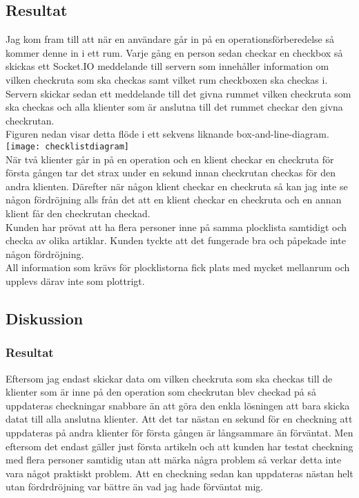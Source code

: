 \subsection{Resultat}
Jag kom fram till att när en användare går in på en operationsförberedelse så kommer denne in i ett rum. Varje gång en person sedan checkar en checkbox så skickas ett Socket.IO meddelande till servern som innehåller information om vilken checkruta som ska checkas samt vilket rum checkboxen ska checkas i. Servern skickar sedan ett meddelande till det givna rummet vilken checkruta som ska checkas och alla klienter som är anslutna till det rummet checkar den givna checkrutan. \\

Figuren nedan visar detta flöde i ett sekvens liknande box-and-line-diagram.
\texttt{[image: checklistdiagram]}\\

När två klienter går in på en operation och en klient checkar en checkruta för första gången tar det strax under en sekund innan checkrutan checkas för den andra klienten. Därefter när någon klient checkar en checkruta så kan jag inte se någon fördröjning alls från det att en klient checkar en checkruta och en annan klient får den checkrutan checkad.\\

Kunden har prövat att ha flera personer inne på samma plocklista samtidigt och checka av olika artiklar. Kunden tyckte att det fungerade bra och påpekade inte någon fördröjning. \\

All information som krävs för plocklistorna fick plats med mycket mellanrum och upplevs därav inte som plottrigt.

\subsection{Diskussion}
\subsubsection{Resultat}
Eftersom jag endast skickar data om vilken checkruta som ska checkas till de klienter som är inne på den operation som checkrutan blev checkad på så uppdateras checkningar snabbare än att göra den enkla lösningen att bara skicka datat till alla anslutna klienter. Att det tar nästan en sekund för en checkning att uppdateras på andra klienter för första gången är långsammare än förväntat. Men eftersom det endast gäller just första artikeln och att kunden har testat checkning med flera personer samtidig utan att märka några problem så verkar detta inte vara något praktiskt problem. Att en checkning sedan kan uppdateras nästan helt utan fördrdröjning var bättre än vad jag hade förväntat mig.

